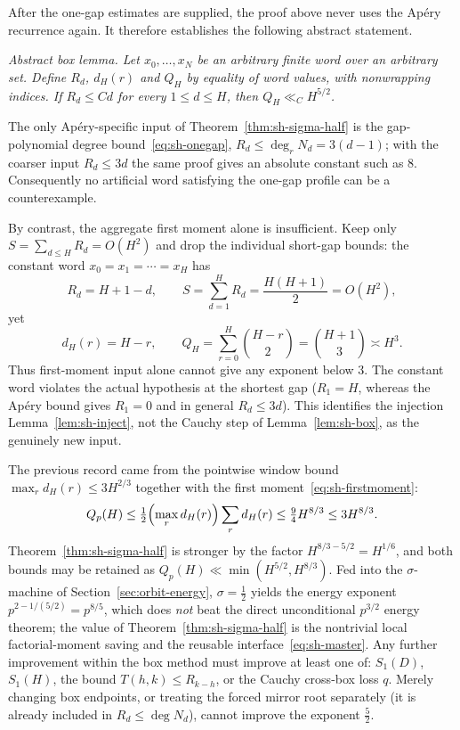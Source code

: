 \begin{remark}
\label{rem:sh-abstract}
After the one-gap estimates are supplied, the proof above never uses the
Ap\'ery recurrence again.  It therefore establishes the following
abstract statement.

\emph{Abstract box lemma.  Let $x_0,\ldots,x_N$ be an arbitrary finite
word over an arbitrary set.  Define $R_d$, $d_H(r)$ and $Q_H$ by
equality of word values, with nonwrapping indices.  If $R_d\le Cd$ for
every $1\le d\le H$, then $Q_H\ll_C H^{5/2}$.}

The only Ap\'ery-specific input of
Theorem~\ref{thm:sh-sigma-half} is the gap-polynomial degree
bound~\eqref{eq:sh-onegap}, $R_d\le\deg_rN_d=3(d-1)$; with the coarser
input $R_d\le3d$ the same proof gives an absolute constant such as $8$.
Consequently no artificial word satisfying the one-gap profile can be a
counterexample.

By contrast, the aggregate first moment alone is insufficient.  Keep
only $S=\sum_{d\le H}R_d=O(H^2)$ and drop the individual short-gap
bounds: the constant word $x_0=x_1=\cdots=x_H$ has
\[
 R_d=H+1-d,\qquad S=\sum_{d=1}^{H}R_d=\frac{H(H+1)}2=O(H^2),
\]
yet
\[
 d_H(r)=H-r,\qquad
 Q_H=\sum_{r=0}^{H}\binom{H-r}{2}=\binom{H+1}{3}\asymp H^3 .
\]
Thus first-moment input alone cannot give any exponent below $3$.  The
constant word violates the actual hypothesis at the shortest gap
($R_1=H$, whereas the Ap\'ery bound gives $R_1=0$ and in general
$R_d\le3d$).  This identifies the injection
Lemma~\ref{lem:sh-inject}, not the Cauchy step of
Lemma~\ref{lem:sh-box}, as the genuinely new input.
\end{remark}

\begin{remark}
\label{rem:sh-context}
The previous record came from the pointwise window bound
$\max_rd_H(r)\le3H^{2/3}$ together with the first
moment~\eqref{eq:sh-firstmoment}:
\[
 Q_p(H)\le\tfrac12\Bigl(\max_rd_H(r)\Bigr)\sum_rd_H(r)
 \le\tfrac94H^{8/3}\le3H^{8/3}.
\]
Theorem~\ref{thm:sh-sigma-half} is stronger by the factor
$H^{8/3-5/2}=H^{1/6}$, and both bounds may be retained as
$Q_p(H)\ll\min(H^{5/2},H^{8/3})$.  Fed into the $\sigma$-machine of
Section~\ref{sec:orbit-energy}, $\sigma=\tfrac12$ yields the energy
exponent $p^{2-1/(5/2)}=p^{8/5}$, which does \emph{not} beat the direct
unconditional $p^{3/2}$ energy theorem; the value of
Theorem~\ref{thm:sh-sigma-half} is the nontrivial local
factorial-moment saving and the reusable
interface~\eqref{eq:sh-master}.  Any further improvement within the box
method must improve at least one of: $S_1(D)$, $S_1(H)$, the bound
$T(h,k)\le R_{k-h}$, or the Cauchy cross-box loss $q$.  Merely changing
box endpoints, or treating the forced mirror root separately (it is
already included in $R_d\le\deg N_d$), cannot improve the exponent
$\tfrac52$.
\end{remark}


